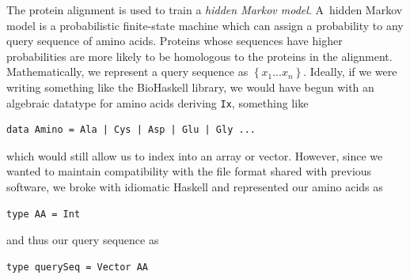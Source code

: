 \documentclass[preprint,nonatbib,blockstyle,nocopyrightspace,times]{sigplanconf}
\begin{document}
The protein alignment is used to train a \emph{hidden Markov model}.
A~hidden Markov model is a probabilistic finite-state machine which 
can assign a probability to any query sequence of amino acids.
Proteins whose sequences have higher probabilities are more likely to
be homologous to the proteins in the alignment.
Mathematically, we represent a query sequence as
$\left\{x_{1}...x_{n}\right\}$.
Ideally, if we were writing something like the BioHaskell library, we would
have begun with an algebraic datatype for amino acids deriving
\texttt{Ix}, something like
\begin{verbatim}data Amino = Ala | Cys | Asp | Glu | Gly ...\end{verbatim}
which would still allow us to index into an array or vector.
However, since we wanted to maintain compatibility with the file format
shared with previous software, we broke with idiomatic Haskell and represented
our amino acids as 
\begin{verbatim}
type AA = Int
\end{verbatim}
and thus our query sequence as
\begin{verbatim}
type querySeq = Vector AA
\end{verbatim}
\end{document}
